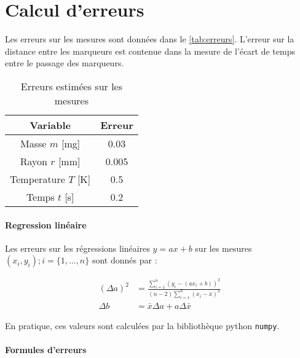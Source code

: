 \section{Calcul d'erreurs}
\label{sec:erreurs}

Les erreurs sur les mesures sont données dans le \autoref{tab:erreurs}. L'erreur sur la distance entre les marqueurs est contenue dans la mesure de l'écart de temps entre le passage des marqueurs.

\begin{table}[h]
    \centering
    \begin{tabulary}{\textwidth}{C C}
        \toprule
        Variable & Erreur \\
        \midrule
        Masse \(m\) [\si{\milli\gram}] & 0.03 \\
        Rayon \(r\) [\si{\milli\meter}] & 0.005 \\
        Temperature \(T\) [\si{\kelvin}] & 0.5 \\
        Temps \(t\) [\si{\second}] & 0.2 \\
        \bottomrule
    \end{tabulary}
    \caption{Erreurs estimées sur les mesures}
    \label{tab:erreurs}
\end{table}

\paragraph*{Regression linéaire}
Les erreurs sur les régressions linéaires \(y = ax + b\) sur les mesures \((x_i, y_i) ; i = \{1, \dots, n\}\) sont donnés par \cite{erreursmesure}:

\begin{equation}
    \label{eq:erreur:fit}
    \begin{aligned}
        (\Delta a)^2 &= \frac{\sum_{i=1}^{n}(y_i - (a x_i + b))^2}{(n-2) \sum_{i=1}^{n}(x_i - \bar{x})^2}\\
        \Delta b &= \bar{x} \Delta a + a \Delta \bar{x}
    \end{aligned}
\end{equation}

En pratique, ces valeurs sont calculées par la bibliothèque python \texttt{numpy}.

\paragraph*{Formules d'erreurs}

